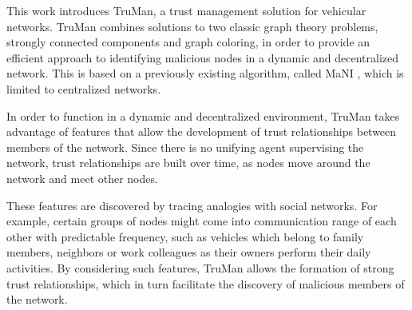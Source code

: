 This work introduces TruMan, a trust management solution for vehicular networks. 
TruMan combines solutions to two classic graph theory problems, strongly connected components and graph coloring, in order to provide an efficient approach to identifying malicious nodes in a dynamic and decentralized network.
This is based on a previously existing algorithm, called MaNI \citep{vernize2015malicious}, which is limited to centralized networks.

In order to function in a dynamic and decentralized environment, TruMan takes advantage of features that allow the development of trust relationships between members of the network.
Since there is no unifying agent supervising the network, trust relationships are built over time, as nodes move around the network and meet other nodes.

These features are discovered by tracing analogies with social networks.
For example, certain groups of nodes might come into communication range of each other with predictable frequency, such as vehicles which belong to family members, neighbors or work colleagues as their owners perform their daily activities.
By considering such features, TruMan allows the formation of strong trust relationships,  which in turn facilitate the discovery of malicious members of the network.







